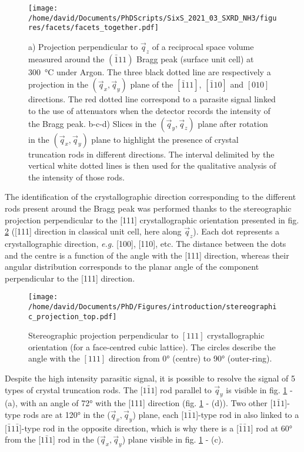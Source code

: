 \begin{figure}[!htb]
    \centering
    \texttt{[image: /home/david/Documents/PhDScripts/SixS\_2021\_03\_SXRD\_NH3/figures/facets/facets\_together.pdf]}
    \caption{
        a) Projection perpendicular to $\vec{q}_z$ of a reciprocal space volume measured around the $(\bar{1}11)$ Bragg peak (surface unit cell) at \qty{300}{\degreeCelsius} under Argon.
        The three black dotted line are respectively a projection in the $(\vec{q}_x, \vec{q}_y)$ plane of the $[\bar{1}11]$, $[\bar{1}10]$ and $[010]$ directions.
        The red dotted line correspond to a parasite signal linked to the use of attenuators when the detector records the intensity of the Bragg peak.
        b-c-d) Slices in the $(\vec{q}_y, \vec{q}_z)$ plane after rotation in the $(\vec{q}_x, \vec{q}_y)$ plane to highlight the presence of crystal truncation rods in different directions.
        The interval delimited by the vertical white dotted lines is then used for the qualitative analysis of the intensity of those rods.
    }
    \label{fig:FacetMaps}
\end{figure}

The identification of the crystallographic direction corresponding to the different rods present around the Bragg peak was performed thanks to the stereographic projection perpendicular to the [111] crystallographic orientation presented in fig. \ref{fig:StereoTop} ([111] direction in classical unit cell, here along $\vec{q}_z$).
Each dot represents a crystallographic direction, \textit{e.g.} [100], [110], etc.
The distance between the dots and the centre is a function of the angle with the [111] direction, whereas their angular distribution corresponds to the planar angle of the component perpendicular to the [111] direction.

\begin{figure}[!htb]
    \centering
    \texttt{[image: /home/david/Documents/PhD/Figures/introduction/stereographic\_projection\_top.pdf]}
    \caption{
        Stereographic projection perpendicular to $[111]$ crystallographic orientation (for a face-centred cubic lattice).
        The circles describe the angle with the $[111]$ direction from \ang{0} (centre) to \ang{90} (outer-ring).
    }
    \label{fig:StereoTop}
\end{figure}

Despite the high intensity parasitic signal, it is possible to resolve the signal of 5 types of crystal truncation rods.
The [$1\bar{1}1$] rod parallel to $\vec{q}_y$ is visible in fig. \ref{fig:FacetMaps} - (a), with an angle of \ang{72} with the [111] direction (fig. \ref{fig:FacetMaps} - (d)).
Two other [$1\bar{1}1$]-type rods are at \ang{120} in the ($\vec{q}_x, \vec{q}_y$) plane, each [$1\bar{1}1$]-type rod in also linked to a [$\bar{1}1\bar{1}$]-type rod in the opposite direction, which is why there is a [$\bar{1}\bar{1}1$] rod at \ang{60} from the [$1\bar{1}1$] rod in the ($\vec{q}_x, \vec{q}_y$) plane visible in fig. \ref{fig:FacetMaps} - (c).

